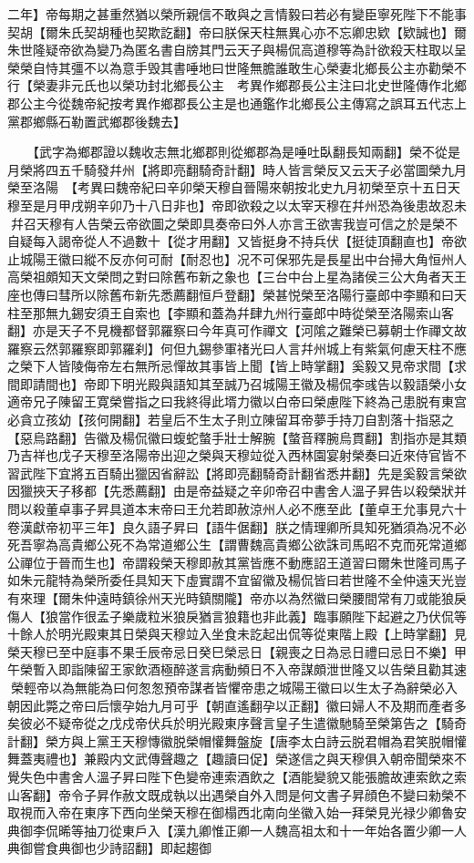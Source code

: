 二年】帝每期之甚重然猶以榮所親信不敢與之言情毅曰若必有變臣寧死陛下不能事契胡【爾朱氏契胡種也契欺訖翻】帝曰朕保天柱無異心亦不忘卿忠欵【欵誠也】爾朱世隆疑帝欲為變乃為匿名書自牓其門云天子與楊侃高道穆等為計欲殺天柱取以呈榮榮自恃其彊不以為意手毁其書唾地曰世隆無膽誰敢生心榮妻北鄉長公主亦勸榮不行【榮妻非元氏也以榮功封北鄉長公主　考異作鄉郡長公主注曰北史世隆傳作北鄉郡公主今從魏帝紀按考異作鄉郡長公主是也通鑑作北鄉長公主傳寫之誤耳五代志上黨郡鄉縣石勒置武鄉郡後魏去】

　　【武字為鄉郡證以魏收志無北鄉郡則從鄉郡為是唾吐臥翻長知兩翻】榮不從是月榮將四五千騎發幷州【將即亮翻騎奇計翻】時人皆言榮反又云天子必當圖榮九月榮至洛陽　【考異曰魏帝紀曰辛卯榮天穆自晉陽來朝按北史九月初榮至京十五日天穆至是月甲戌朔辛卯乃十八日非也】帝即欲殺之以太宰天穆在幷州恐為後患故忍未幷召天穆有人告榮云帝欲圖之榮即具奏帝曰外人亦言王欲害我豈可信之於是榮不自疑每入謁帝從人不過數十【從才用翻】又皆挺身不持兵伏【挺徒頂翻直也】帝欲止城陽王徽曰縱不反亦何可耐【耐忍也】况不可保邪先是長星出中台掃大角恒州人高榮祖頗知天文榮問之對曰除舊布新之象也【三台中台上星為諸侯三公大角者天王座也傳曰彗所以除舊布新先悉薦翻恒戶登翻】榮甚悦榮至洛陽行臺郎中李顯和曰天柱至那無九錫安須王自索也【李顯和蓋為幷肆九州行臺郎中時從榮至洛陽索山客翻】亦是天子不見機都督郭羅察曰今年真可作禪文【河隂之難榮已募朝士作禪文故羅察云然郭羅察即郭羅刹】何但九錫參軍禇光曰人言幷州城上有紫氣何慮天柱不應之榮下人皆陵侮帝左右無所忌憚故其事皆上聞【皆上時掌翻】奚毅又見帝求間【求間即請間也】帝即下明光殿與語知其至誠乃召城陽王徽及楊侃李彧告以毅語榮小女適帝兄子陳留王寛榮嘗指之曰我終得此壻力徽以白帝曰榮慮陛下終為己患脱有東宫必貪立孩幼【孩何開翻】若皇后不生太子則立陳留耳帝夢手持刀自割落十指惡之【惡烏路翻】告徽及楊侃徽曰蝮蛇螫手壯士解腕【螫音釋腕烏貫翻】割指亦是其類乃吉祥也戊子天穆至洛陽帝出迎之榮與天穆竝從入西林園宴射榮奏曰近來侍官皆不習武陛下宜將五百騎出獵因省辭訟【將即亮翻騎奇計翻省悉井翻】先是奚毅言榮欲因獵挾天子移都【先悉薦翻】由是帝益疑之辛卯帝召中書舍人溫子昇告以殺榮狀并問以殺董卓事子昇具道本末帝曰王允若即赦涼州人必不應至此【董卓王允事見六十卷漢獻帝初平三年】良久語子昇曰【語牛倨翻】朕之情理卿所具知死猶須為况不必死吾寧為高貴鄉公死不為常道鄉公生【謂曹魏高貴鄉公欲誅司馬昭不克而死常道鄉公禪位于晉而生也】帝謂殺榮天穆即赦其黨皆應不動應詔王道習曰爾朱世隆司馬子如朱元龍特為榮所委任具知天下虛實謂不宜留徽及楊侃皆曰若世隆不全仲遠天光豈有來理【爾朱仲遠時鎮徐州天光時鎮關隴】帝亦以為然徽曰榮腰間常有刀或能狼戾傷人【狼當作很孟子樂歲粒米狼戾猶言狼籍也非此義】臨事願陛下起避之乃伏侃等十餘人於明光殿東其日榮與天穆竝入坐食未訖起出侃等從東階上殿【上時掌翻】見榮天穆已至中庭事不果壬辰帝忌日癸巳榮忌日【親喪之日為忌日禮曰忌日不樂】甲午榮暫入即詣陳留王家飲酒極醉遂言病動頻日不入帝謀頗泄世隆又以告榮且勸其速榮輕帝以為無能為曰何怱怱預帝謀者皆懼帝患之城陽王徽曰以生太子為辭榮必入朝因此斃之帝曰后懷孕始九月可乎【朝直遙翻孕以正翻】徽曰婦人不及期而產者多矣彼必不疑帝從之戊戍帝伏兵於明光殿東序聲言皇子生遣徽馳騎至榮第告之【騎奇計翻】榮方與上黨王天穆慱徽脱榮帽懽舞盤旋【唐李太白詩云脱君帽為君笑脱帽懽舞蓋夷禮也】兼殿内文武傳聲趣之【趣讀曰促】榮遂信之與天穆俱入朝帝聞榮來不覺失色中書舍人溫子昇曰陛下色變帝連索酒飲之【酒能變貌又能張膽故連索飲之索山客翻】帝令子昇作赦文既成執以出遇榮自外入問是何文書子昇顔色不變曰勑榮不取視而入帝在東序下西向坐榮天穆在御榻西北南向坐徽入始一拜榮見光禄少卿魯安典御李侃晞等抽刀從東戶入【漢九卿惟正卿一人魏高祖太和十一年始各置少卿一人典御嘗食典御也少詩詔翻】即起趨御